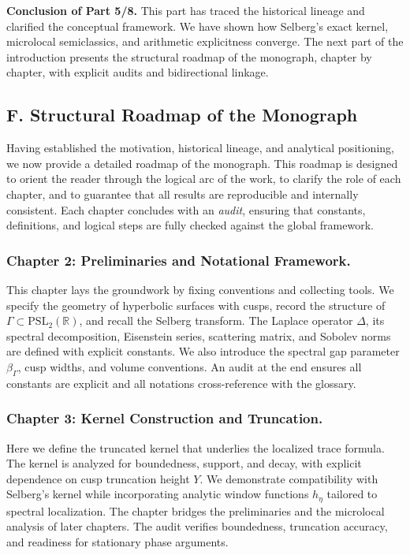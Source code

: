 \medskip

\noindent\textbf{Conclusion of Part 5/8.}
This part has traced the historical lineage and clarified the conceptual framework.
We have shown how Selberg’s exact kernel,
microlocal semiclassics, and arithmetic explicitness converge.
The next part of the introduction presents the structural roadmap of the monograph,
chapter by chapter, with explicit audits and bidirectional linkage.


\subsection*{F. Structural Roadmap of the Monograph}

Having established the motivation, historical lineage, and analytical positioning,
we now provide a detailed roadmap of the monograph.
This roadmap is designed to orient the reader through the logical arc of the work,
to clarify the role of each chapter, and to guarantee
that all results are reproducible and internally consistent.
Each chapter concludes with an \emph{audit}, ensuring that constants, definitions,
and logical steps are fully checked against the global framework.

\subsubsection*{Chapter 2: Preliminaries and Notational Framework.}
This chapter lays the groundwork by fixing conventions and collecting tools.
We specify the geometry of hyperbolic surfaces with cusps,
record the structure of $\Gamma\subset \mathrm{PSL}_2(\mathbb{R})$,
and recall the Selberg transform.
The Laplace operator $\Delta$, its spectral decomposition,
Eisenstein series, scattering matrix, and Sobolev norms are defined with explicit constants.
We also introduce the spectral gap parameter $\beta_\Gamma$,
cusp widths, and volume conventions.
An audit at the end ensures all constants are explicit
and all notations cross-reference with the glossary.

\subsubsection*{Chapter 3: Kernel Construction and Truncation.}
Here we define the truncated kernel that underlies the localized trace formula.
The kernel is analyzed for boundedness, support, and decay,
with explicit dependence on cusp truncation height $Y$.
We demonstrate compatibility with Selberg’s kernel
while incorporating analytic window functions $h_\eta$ tailored to spectral localization.
The chapter bridges the preliminaries and the microlocal analysis of later chapters.
The audit verifies boundedness, truncation accuracy,
and readiness for stationary phase arguments.

